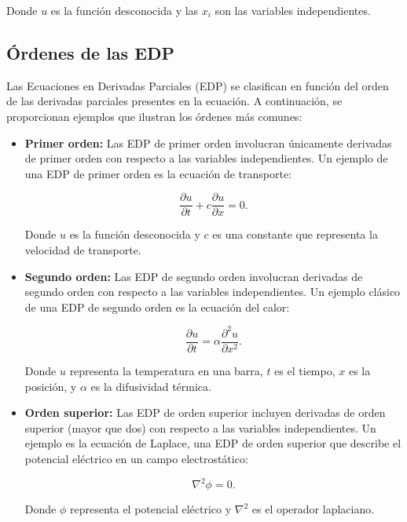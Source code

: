 \documentclass[11pt]{book}
\theoremstyle{plain}
\theoremstyle{definition}
\begin{document}
Donde $u$ es la función desconocida y las $x_i$ son las variables independientes.

\subsection*{Órdenes de las EDP}

Las Ecuaciones en Derivadas Parciales (EDP) se clasifican en función del orden de las derivadas parciales presentes en la ecuación. A continuación, se proporcionan ejemplos que ilustran los órdenes más comunes:

\begin{itemize}
    \item \textbf{Primer orden:} Las EDP de primer orden involucran únicamente derivadas de primer orden con respecto a las variables independientes. Un ejemplo de una EDP de primer orden es la ecuación de transporte:
    
    \begin{equation}
    \frac{\partial u}{\partial t} + c\frac{\partial u}{\partial x} = 0.
    \end{equation}
    
    Donde $u$ es la función desconocida y $c$ es una constante que representa la velocidad de transporte.

    \item \textbf{Segundo orden:} Las EDP de segundo orden involucran derivadas de segundo orden con respecto a las variables independientes. Un ejemplo clásico de una EDP de segundo orden es la ecuación del calor:
    
    \begin{equation}
    \frac{\partial u}{\partial t} = \alpha \frac{\partial^2 u}{\partial x^2}.
    \end{equation}
    
    Donde $u$ representa la temperatura en una barra, $t$ es el tiempo, $x$ es la posición, y $\alpha$ es la difusividad térmica.

    \item \textbf{Orden superior:} Las EDP de orden superior incluyen derivadas de orden superior (mayor que dos) con respecto a las variables independientes. Un ejemplo es la ecuación de Laplace, una EDP de orden superior que describe el potencial eléctrico en un campo electrostático:
    
    \begin{equation}
    \nabla^2 \phi = 0.
    \end{equation}
    
    Donde $\phi$ representa el potencial eléctrico y $\nabla^2$ es el operador laplaciano.
\end{itemize}
\end{document}
